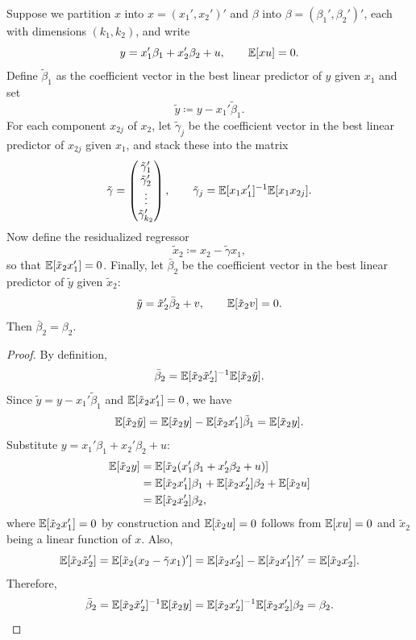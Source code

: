 \begin{proposition}
	Suppose we partition $x$ into $x = (x_1',x_2')'$ and $\beta$ into $\beta=(\beta_1',\beta_2')'$, each with dimensions $(k_1,k_2)$, and write
	\[
		y = x_1'\beta_1 + x_2'\beta_2 + u, \qquad \mathbb{E}[xu]=0.
	\]
	Define $\tilde{\beta}_1$ as the coefficient vector in the best linear predictor of $y$ given $x_1$ and set
	\[
		\tilde{y} \coloneqq y - x_1'\tilde{\beta}_1.
	\]
	For each component $x_{2j}$ of $x_2$, let $\tilde{\gamma}_j$ be the coefficient vector in the best linear predictor of $x_{2j}$ given $x_1$, and stack these into the matrix
	\[
		\tilde{\gamma}
		=
		\begin{pmatrix}
			\tilde{\gamma}_1'\\
			\tilde{\gamma}_2'\\
			\vdots\\
			\tilde{\gamma}_{k_2}'
		\end{pmatrix},
		\qquad
		\tilde{\gamma}_j
		=
		\mathbb{E}[x_1x_1']^{-1}\mathbb{E}[x_1 x_{2j}].
	\]
	Now define the residualized regressor
	\[
		\tilde{x}_2 \coloneqq x_2 - \tilde{\gamma}x_1,
	\]
	so that $\mathbb{E}[\tilde{x}_2 x_1']=0$.
	Finally, let $\bar{\beta}_2$ be the coefficient vector in the best linear predictor of $\tilde{y}$ given $\tilde{x}_2$:
	\[
		\tilde{y} = \tilde{x}_2'\bar{\beta}_2 + v, \qquad \mathbb{E}[\tilde{x}_2 v]=0.
	\]
	Then $\bar{\beta}_2=\beta_2$.
\end{proposition}
\begin{proof}
	By definition,
	\[
		\bar{\beta}_2 = \mathbb{E}[\tilde{x}_2\tilde{x}_2']^{-1}\mathbb{E}[\tilde{x}_2\tilde{y}].
	\]
	Since $\tilde{y}=y-x_1'\tilde{\beta}_1$ and $\mathbb{E}[\tilde{x}_2 x_1']=0$, we have
	\[
		\mathbb{E}[\tilde{x}_2\tilde{y}] = \mathbb{E}[\tilde{x}_2 y] - \mathbb{E}[\tilde{x}_2 x_1']\tilde{\beta}_1 = \mathbb{E}[\tilde{x}_2 y].
	\]
	Substitute $y=x_1'\beta_1+x_2'\beta_2+u$:
	\begin{align*}
		\mathbb{E}[\tilde{x}_2 y]
		&= \mathbb{E}\!\left[\tilde{x}_2(x_1'\beta_1 + x_2'\beta_2 + u)\right] \\
		&= \mathbb{E}[\tilde{x}_2 x_1']\beta_1 + \mathbb{E}[\tilde{x}_2 x_2']\beta_2 + \mathbb{E}[\tilde{x}_2 u] \\
		&= \mathbb{E}[\tilde{x}_2 x_2']\beta_2,
	\end{align*}
	where $\mathbb{E}[\tilde{x}_2 x_1']=0$ by construction and $\mathbb{E}[\tilde{x}_2 u]=0$ follows from $\mathbb{E}[xu]=0$ and $\tilde{x}_2$ being a linear function of $x$.
	Also,
	\[
		\mathbb{E}[\tilde{x}_2\tilde{x}_2'] = \mathbb{E}[\tilde{x}_2(x_2-\tilde{\gamma}x_1)'] = \mathbb{E}[\tilde{x}_2 x_2'] - \mathbb{E}[\tilde{x}_2 x_1']\tilde{\gamma}' = \mathbb{E}[\tilde{x}_2 x_2'].
	\]
	Therefore,
	\[
		\bar{\beta}_2
		= \mathbb{E}[\tilde{x}_2\tilde{x}_2']^{-1}\mathbb{E}[\tilde{x}_2 y]
		= \mathbb{E}[\tilde{x}_2 x_2']^{-1}\mathbb{E}[\tilde{x}_2 x_2']\beta_2
		= \beta_2.
	\]
\end{proof}

